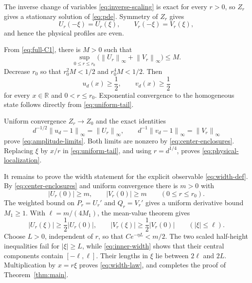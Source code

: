 \documentclass[11pt,reqno]{amsart}
\numberwithin{equation}{section}
\theoremstyle{remark}
\newcommand{\R}{\mathbb R}
\newcommand{\norm}[1]{\left\lVert #1\right\rVert}
\begin{document}
The inverse change of variables \eqref{eq:inverse-scaling} is exact for every
$r>0$, so $Z_r$ gives a stationary solution of \eqref{eq:pde}.  Symmetry of
$Z_r$ gives
\[
 U_r(-\xi)=U_r(\xi),\qquad V_r(-\xi)=V_r(\xi),
\]
and hence the physical profiles are even.

From \eqref{eq:full-C1}, there is $M>0$ such that
\begin{equation}\label{eq:uniform-components}
 \sup_{0\le r\le r_0}
 \bigl(\norm{U_r}_\infty+\norm{V_r}_\infty\bigr)\le M.
\end{equation}
Decrease $r_0$ so that $r_0^2M<1/2$ and $r_0^4M<1/2$.  Then
\begin{equation}\label{eq:positive}
 u_d(x)\ge\frac12,
 \qquad v_d(x)\ge\frac12
\end{equation}
for every $x\in\R$ and $0<r\le r_0$.  Exponential convergence to the
homogeneous state follows directly from \eqref{eq:uniform-tail}.

Uniform convergence $Z_r\to Z_0$ and the exact identities
\begin{equation}\label{eq:exact-amplitudes}
 d^{-1/2}\norm{u_d-1}_\infty=\norm{U_r}_\infty,
 \qquad
 d^{-1}\norm{v_d-1}_\infty=\norm{V_r}_\infty
\end{equation}
prove \eqref{eq:amplitude-limits}.  Both limits are nonzero by
\eqref{eq:center-enclosures}.  Replacing $\xi$ by $x/r$ in
\eqref{eq:uniform-tail}, and using $r=d^{1/4}$, proves
\eqref{eq:physical-localization}.

It remains to prove the width statement for the explicit observable
\eqref{eq:width-def}.  By \eqref{eq:center-enclosures} and uniform
convergence there is $m>0$ with
\begin{equation}\label{eq:center-lower}
 |U_r(0)|\ge m,
 \qquad |V_r(0)|\ge m
 \qquad(0\le r\le r_0).
\end{equation}
The weighted bound on $P_r=U_r'$ and $Q_r=V_r'$ gives a uniform derivative
bound $M_1\ge1$.  With $\ell=m/(4M_1)$, the mean-value theorem gives
\begin{equation}\label{eq:inner-width}
 |U_r(\xi)|\ge\frac12|U_r(0)|,
 \qquad |V_r(\xi)|\ge\frac12|V_r(0)|
 \qquad(|\xi|\le\ell).
\end{equation}
Choose $L>0$, independent of $r$, so that $Ce^{-\eta L}<m/2$.
The two scaled half-height inequalities fail for $|\xi|\ge L$, while
\eqref{eq:inner-width} shows that their central components contain
$[-\ell,\ell]$.  Their lengths in $\xi$ lie between $2\ell$ and $2L$.
Multiplication by $x=r\xi$ proves \eqref{eq:width-law}, and completes the
proof of Theorem~\ref{thm:main}.
\end{document}
